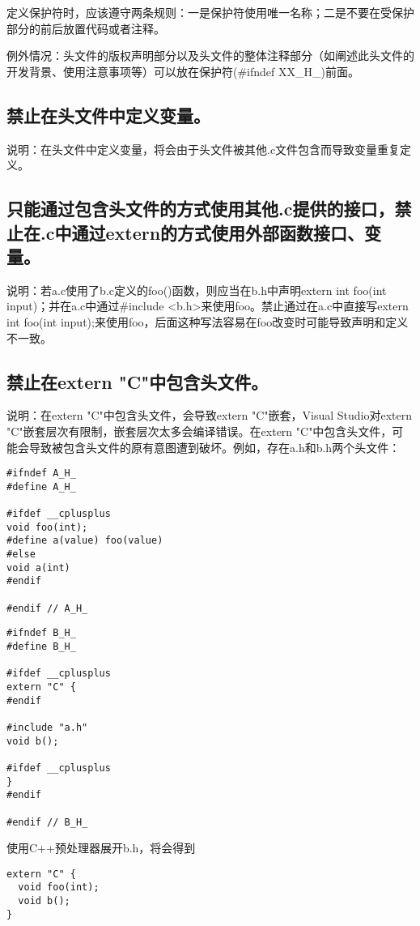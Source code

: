 定义保护符时，应该遵守两条规则：一是保护符使用唯一名称；二是不要在受保护部分的前后放置代码或者注释。

例外情况：头文件的版权声明部分以及头文件的整体注释部分（如阐述此头文件的开发背景、使用注意事项等）可以放在保护符(\#ifndef XX\_H\_)前面。


\subsection{禁止在头文件中定义变量。}
说明：在头文件中定义变量，将会由于头文件被其他.c文件包含而导致变量重复定义。


\subsection{只能通过包含头文件的方式使用其他.c提供的接口，禁止在.c中通过extern的方式使用外部函数接口、变量。}
说明：若a.c使用了b.c定义的foo()函数，则应当在b.h中声明extern int foo(int input)；并在a.c中通过\#include <b.h>来使用foo。禁止通过在a.c中直接写extern int foo(int input);来使用foo，后面这种写法容易在foo改变时可能导致声明和定义不一致。


\subsection{禁止在extern "C"中包含头文件。}
说明：在extern "C"中包含头文件，会导致extern "C"嵌套，Visual Studio对extern "C"嵌套层次有限制，嵌套层次太多会编译错误。在extern "C"中包含头文件，可能会导致被包含头文件的原有意图遭到破坏。例如，存在a.h和b.h两个头文件：
\begin{verbatim}
#ifndef A_H_
#define A_H_

#ifdef __cplusplus
void foo(int);
#define a(value) foo(value)
#else
void a(int)
#endif

#endif // A_H_
\end{verbatim}
\begin{verbatim}
#ifndef B_H_
#define B_H_

#ifdef __cplusplus
extern "C" {
#endif

#include "a.h"
void b();

#ifdef __cplusplus
}
#endif

#endif // B_H_
\end{verbatim}

使用C++预处理器展开b.h，将会得到
\begin{verbatim}
extern "C" {
  void foo(int);
  void b();
}
\end{verbatim}

